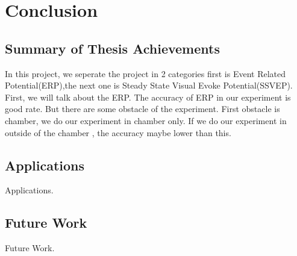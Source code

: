 \chapter{Conclusion}

\label{ch:conclusions}

\section{Summary of Thesis Achievements}

In this project, we seperate the project in 2 categories first is Event Related Potential(ERP),the next one is Steady State Visual Evoke Potential(SSVEP). First, we will talk about the ERP. The accuracy of ERP in our experiment is good rate. But there are some obstacle of the experiment. First obstacle is chamber, we do our experiment in chamber only. If we do our experiment in outside of the chamber , the accuracy maybe lower than this. 


\section{Applications}

Applications.


\section{Future Work}

Future Work.